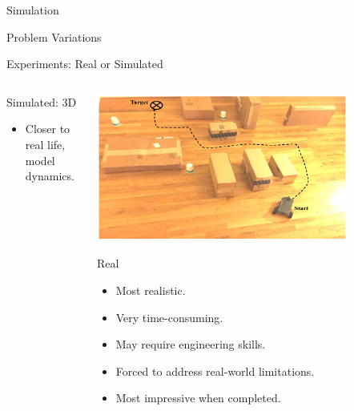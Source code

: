 \documentclass[9pt]{beamer}
\begin{document}
\begin{section}{Simulation}
\begin{frame}{Problem Variations}
\begin{block}{Experiments: Real or Simulated}
\begin{columns}
\begin{column}{0.5\textwidth}
                    \begin{block}{Simulated: 3D}
                        \begin{itemize}
                            \item Closer to real life, model dynamics.
                        \end{itemize}
                    \end{block}                    
                \end{column}
                \begin{column}{0.5\textwidth}
                    \begin{center}
                    \includegraphics[width=0.8\textwidth,trim={0cm 0cm 0cm 0cm},clip]{exp_real.png}
                    \end{center}
                    \begin{block}{Real}
                        \begin{itemize}
                            \item Most realistic.
                            \item Very time-consuming.
                            \item May require engineering skills.
                            \item Forced to address real-world limitations.
                            \item Most impressive when completed. 
                        \end{itemize}
                    \end{block}
                \end{column}                
            \end{columns}           
        \end{block}
    \end{frame}
\end{section}
\end{document}

